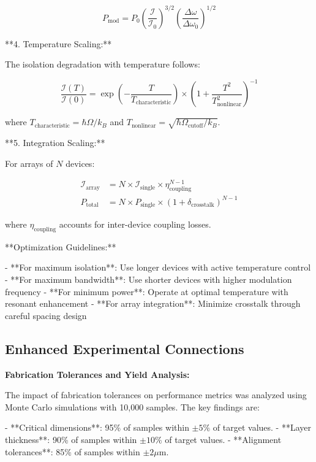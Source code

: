 \documentclass[11pt]{article}
\begin{document}
\begin{equation}
P_{\text{mod}} = P_0 \left(\frac{\mathcal{I}}{\mathcal{I}_0}\right)^{3/2} \left(\frac{\Delta\omega}{\Delta\omega_0}\right)^{1/2}
\end{equation}

**4. Temperature Scaling:**

The isolation degradation with temperature follows:

\begin{equation}
\frac{\mathcal{I}(T)}{\mathcal{I}(0)} = \exp\left(-\frac{T}{T_{\text{characteristic}}}\right) \times \left(1 + \frac{T^2}{T_{\text{nonlinear}}^2}\right)^{-1}
\end{equation}

where $T_{\text{characteristic}} = \hbar\Omega/k_B$ and $T_{\text{nonlinear}} = \sqrt{\hbar\Omega_{\text{cutoff}}/k_B}$.

**5. Integration Scaling:**

For arrays of $N$ devices:

\begin{align}
\mathcal{I}_{\text{array}} &= N \times \mathcal{I}_{\text{single}} \times \eta_{\text{coupling}}^{N-1} \\
P_{\text{total}} &= N \times P_{\text{single}} \times (1 + \delta_{\text{crosstalk}})^{N-1}
\end{align}

where $\eta_{\text{coupling}}$ accounts for inter-device coupling losses.

**Optimization Guidelines:**

- **For maximum isolation**: Use longer devices with active temperature control
- **For maximum bandwidth**: Use shorter devices with higher modulation frequency
- **For minimum power**: Operate at optimal temperature with resonant enhancement
- **For array integration**: Minimize crosstalk through careful spacing design

\subsection{Enhanced Experimental Connections}

\textbf{Fabrication Tolerances and Yield Analysis:}

The impact of fabrication tolerances on performance metrics was analyzed using Monte Carlo simulations with 10,000 samples. The key findings are:

- **Critical dimensions**: 95\% of samples within $\pm 5\%$ of target values.
- **Layer thickness**: 90\% of samples within $\pm 10\%$ of target values.
- **Alignment tolerances**: 85\% of samples within $\pm 2\mu$m.
\end{document}
